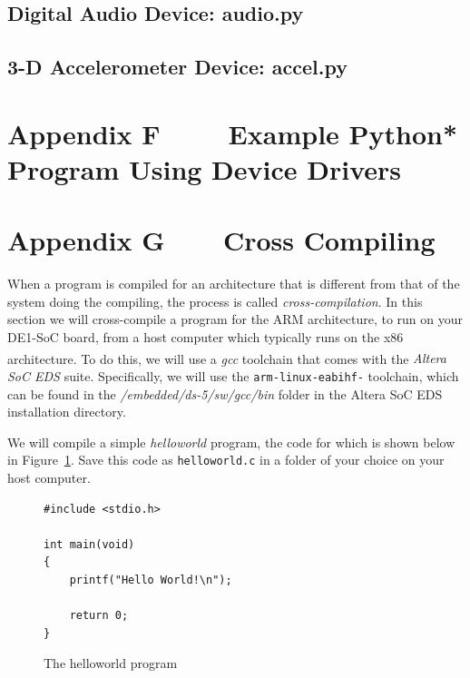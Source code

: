 \documentclass[11pt, twoside, pdftex]{article}
\begin{document}
\subsection*{Digital Audio Device: audio.py}

\newpage
\subsection*{3-D Accelerometer Device: accel.py}


\newpage
\section*{Appendix F~~~~ Example Python* Program Using Device Drivers}



\newpage
\section*{Appendix G~~~~Cross Compiling}

When a program is compiled for an architecture that is different from that of the system 
doing the compiling, the process is called {\it cross-compilation}. In this section we will 
cross-compile a program for the ARM architecture, to run on your DE1-SoC board, from a 
host computer which typically runs on the x86 architecture. To do this, we will use a 
{\it gcc} toolchain that comes with the {\it Altera\textsuperscript{\textregistered} SoC EDS} suite. Specifically, we will use 
the \texttt{arm-linux-eabihf-} toolchain, which can be found in 
the \textit{/embedded/ds-5/sw/gcc/bin} folder in the Altera SoC EDS installation directory.

We will compile a simple {\it helloworld} program, the code for which is shown below in 
Figure~\ref{fig:helloworld_code_2}. Save this code as \texttt{helloworld.c} in a folder of 
your choice on your host computer.

\lstset{language=C,numbers=left}
\begin{figure}[H]
\begin{center}
\begin{minipage}[t]{16 cm}
\begin{lstlisting}
#include <stdio.h>

int main(void)
{
    printf("Hello World!\n");
    
    return 0;
}
\end{lstlisting}
\end{minipage}
\end{center}
\vspace{-0.33in}\caption{The helloworld program}
\label{fig:helloworld_code_2}
\end{figure}
\end{document}
